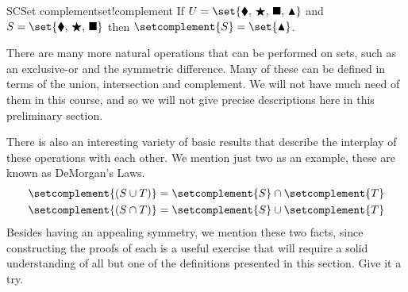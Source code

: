 %
\begin{example}{SC}{Set complement}{set!complement}
If $U=\set{\blacklozenge,\,\bigstar,\,\blacksquare,\,\blacktriangle}$ and $S=\set{\blacklozenge,\,\bigstar,\,\blacksquare}$ then $\setcomplement{S}=\set{\blacktriangle}$.
\end{example}
%
There are many more natural operations that can be performed on sets, such as an exclusive-or and the symmetric difference.  Many of these can be defined in terms of the union, intersection and complement.  We will not have much need of them in this course, and so we will not give precise descriptions here in this preliminary section.\par
%
There is also an interesting variety of basic results that describe the interplay of these operations with each other.  We mention just two as an example, these are known as DeMorgan's Laws.
%
\begin{align*}
\setcomplement{\left(S\cup T\right)}&=\setcomplement{S}\cap\setcomplement{T}\\
\setcomplement{\left(S\cap T\right)}&=\setcomplement{S}\cup\setcomplement{T}\\
\end{align*}
%
Besides having an appealing symmetry, we mention these two facts, since constructing the proofs of each is a useful exercise that will require a solid understanding of all but one of the definitions presented in this section.  Give it a try.
%
%

